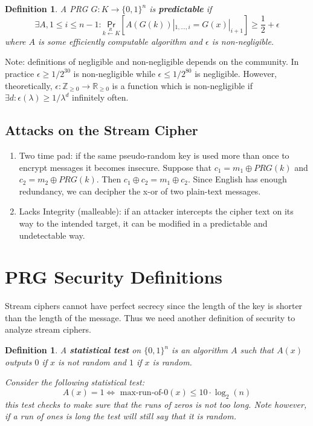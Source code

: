\documentclass[twoside]{article}
\newtheorem{definition}[theorem]{Definition}
\def\Pr{\mathsf{Pr}}
\def\Z{\mathbb{Z}}
\def\R{\mathbb{R}}
\begin{document}
\begin{definition}
A PRG $G: K \rightarrow \{0,1\}^n$ is \textbf{predictable} if 
\[\exists A, 1 \leq i \leq n-1: \underset{k \xleftarrow{R} K}{\Pr} \left[A(G(k))|_{1, ..., i} = G(x)|_{i+1}\right] \geq \frac{1}{2} + \epsilon\]
where $A$ is some efficiently computable algorithm and $\epsilon$ is \emph{non-negligible}.
\end{definition}

Note: definitions of negligible and non-negligible depends on the community. In practice $\epsilon \geq 1/2^{30}$ is non-negligible while $\epsilon \leq 1/2^{80}$ is negligible. However, theoretically, $\epsilon: \Z_{\geq 0} \rightarrow \R_{\geq 0}$ is a function which is non-negligible if $\exists d: \epsilon(\lambda) \geq 1/\lambda^d$ infinitely often.

\subsection{Attacks on the Stream Cipher}
\begin{enumerate}
\item Two time pad: if the same pseudo-random key is used more than once to encrypt messages it becomes insecure. Suppose that $c_1 = m_1 \oplus PRG(k)$ and $c_2 = m_2 \oplus PRG(k)$. Then $c_1 \oplus c_2 = m_1 \oplus c_2$. Since English has enough redundancy, we can decipher the x-or of two plain-text messages.
\item Lacks Integrity (malleable): if an attacker intercepts the cipher text on its way to the intended target, it can be modified in a predictable and undetectable way.
\end{enumerate}

\section{PRG Security Definitions}
Stream ciphers cannot have perfect secrecy since the length of the key is shorter than the length of the message. Thus we need another definition of security to analyze stream ciphers.

\begin{definition}
A \textbf{statistical test} on $\{0, 1\}^n$ is an algorithm $A$ such that $A(x)$ outputs $0$ if $x$ is not random and $1$ if $x$ is random.

Consider the following statistical test:
\[A(x) = 1 \iff \mbox{ max-run-of-}0(x) \leq 10 \cdot \log_2(n)\]
this test checks to make sure that the runs of zeros is not too long. Note however, if a run of ones is long the test will still say that it is random.
\end{definition}
\end{document}
